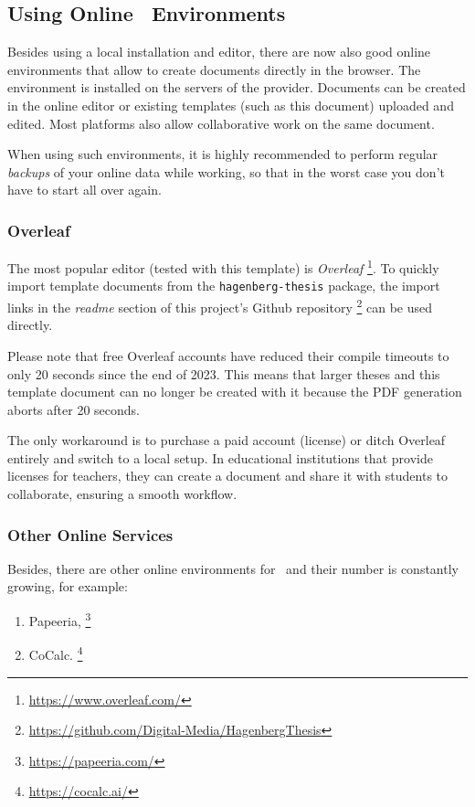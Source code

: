 \subsection{Using Online \latex\ Environments}

Besides using a local \latex installation and editor, there are now also good online 
environments that allow to create \latex documents directly in the browser.
The \latex environment is installed on the servers of the provider. Documents can be
created in the online editor or existing templates (such as this document) uploaded and 
edited. Most platforms also allow collaborative work on the same document.

When using such environments, it is highly recommended to perform regular \emph{backups} of your
online data while working, so that in the worst case you don't have to start all over 
again.

\subsubsection{Overleaf}

The most popular editor (tested with this template) is \emph{Overleaf}%
\footnote{\url{https://www.overleaf.com/}}.
To quickly import template documents from the \texttt{hagenberg-thesis} package, the 
import links in the \emph{readme} section of this project's Github repository%
\footnote{\url{https://github.com/Digital-Media/HagenbergThesis}}
can be used directly.

Please note that free Overleaf accounts have reduced their compile timeouts to only 20 seconds since the end of 2023. This means that larger theses and this template document can no longer be created with it because the PDF generation aborts after 20 seconds.

The only workaround is to purchase a paid account (license) or ditch Overleaf entirely and switch to a local setup. In educational institutions that provide licenses for teachers, they can create a document and share it with students to collaborate, ensuring a smooth workflow.


\subsubsection{Other Online Services}

Besides, there are other online environments for \latex\ and their number is constantly growing, for example:
%
\begin{enumerate}
	\item Papeeria,%
	\footnote{\url{https://papeeria.com/}}
	\item CoCalc.%
	\footnote{\url{https://cocalc.ai/}}
\end{enumerate}

